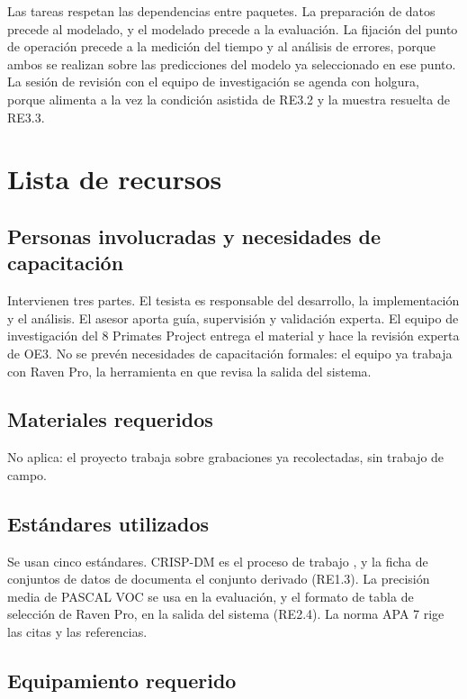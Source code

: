 Las tareas respetan las dependencias entre paquetes. La preparación de datos
precede al modelado, y el modelado precede a la evaluación. La fijación del punto
de operación precede a la medición del tiempo y al análisis de errores, porque
ambos se realizan sobre las predicciones del modelo ya seleccionado en ese punto.
La sesión de revisión con el equipo de investigación se agenda con holgura, porque
alimenta a la vez la condición asistida de RE3.2 y la muestra resuelta de RE3.3.


\section{Lista de recursos}
\label{sec:recursos}

\subsection{Personas involucradas y necesidades de capacitación}

Intervienen tres partes. El tesista es responsable del desarrollo, la implementación y el
análisis. El asesor aporta guía, supervisión y validación experta. El equipo de
investigación del 8 Primates Project entrega el material y hace la revisión
experta de OE3. No se prevén necesidades de capacitación formales: el equipo ya
trabaja con Raven Pro, la herramienta en que revisa la salida del sistema.

\subsection{Materiales requeridos}

No aplica: el proyecto trabaja sobre grabaciones ya recolectadas, sin trabajo de
campo.

\subsection{Estándares utilizados}

Se usan cinco estándares. CRISP-DM es el proceso de trabajo
\citep{chapman_crisp-dm_2000}, y la ficha de conjuntos de datos de
\citet{gebru_2021} documenta el conjunto derivado (RE1.3). La precisión media de
PASCAL VOC \citep{everingham_retrospective_2015} se usa en la evaluación, y el
formato de tabla de selección de Raven Pro, en la salida del sistema (RE2.4). La
norma APA 7 rige las citas y las referencias.

\subsection{Equipamiento requerido}

